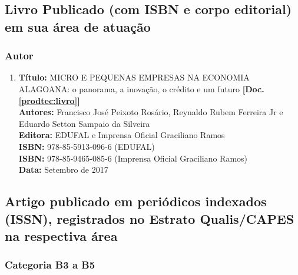 \documentclass[a4paper,oneside,10pt]{article}
\begin{document}
\subsection{Livro Publicado (com ISBN e corpo editorial) em sua área de atuação}
\vspace{0.3cm}


\subsubsection{Autor}
\vspace{0.3cm}

\begin{enumerate}
\renewcommand{\labelenumi}{{\large\bfseries\arabic{enumi}.}}

\item   \textbf{Título:} MICRO E PEQUENAS EMPRESAS NA ECONOMIA ALAGOANA: o panorama, a inovação, o crédito e um futuro \textbf{[Doc. \ref{prodtec:livro}]}\\
        \textbf{Autores:} Francisco José Peixoto Rosário, Reynaldo Rubem Ferreira Jr e Eduardo Setton Sampaio da Silveira\\
        \textbf{Editora:} EDUFAL e Imprensa Oficial Graciliano Ramos\\
        \textbf{ISBN:} 978-85-5913-096-6 (EDUFAL)\\
        \textbf{ISBN:} 978-85-9465-085-6 (Imprensa Oficial Graciliano Ramos)\\
        \textbf{Data:} Setembro de 2017\\

\end{enumerate}



\subsection{Artigo publicado em periódicos indexados (ISSN), registrados no Estrato Qualis/CAPES na respectiva área}
\vspace{0.3cm}


\subsubsection{Categoria B3 a B5}
\vspace{0.3cm}
\end{document}
